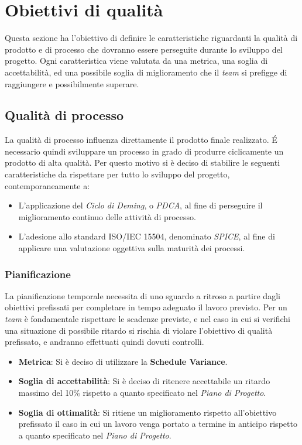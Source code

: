 \section{Obiettivi di qualità}
Questa sezione ha l'obiettivo di definire le caratteristiche riguardanti la qualità di prodotto e di processo che dovranno essere perseguite durante lo sviluppo del progetto.
Ogni caratteristica viene valutata da una metrica, una soglia di accettabilità, ed una possibile soglia di miglioramento che il \emph{team} si prefigge di raggiungere e possibilmente superare.

\subsection{Qualità di processo}
La qualità di processo influenza direttamente il prodotto finale realizzato. É necessario quindi sviluppare un processo in grado di produrre ciclicamente un prodotto di alta qualità. Per questo motivo si è deciso di stabilire le seguenti caratteristiche da rispettare per tutto lo sviluppo del progetto, contemporaneamente a:
\begin{itemize}
\item L'applicazione del \emph{Ciclo di Deming}, o \emph{PDCA}, al fine di perseguire il miglioramento continuo delle attività di processo.
\item L'adesione allo standard ISO/IEC 15504, denominato \emph{SPICE}, al fine di applicare una valutazione oggettiva sulla maturità dei processi.
\end{itemize} 

\subsubsection{Pianificazione}
La pianificazione temporale necessita di uno sguardo a ritroso a partire dagli obiettivi prefissati per completare in tempo adeguato il lavoro previsto. Per un \emph{team} è fondamentale rispettare le scadenze previste, e nel caso in cui si verifichi una situazione di possibile ritardo si rischia di violare l'obiettivo di qualità prefissato, e andranno effettuati quindi dovuti controlli.
\begin{itemize}
	\item \textbf{Metrica}: Si è deciso di utilizzare la \textbf{Schedule Variance}.
	\item \textbf{Soglia di accettabilità}: Si è deciso di ritenere accettabile un ritardo massimo del 10\% rispetto a quanto specificato nel \emph{Piano di Progetto}.
	\item \textbf{Soglia di ottimalità}: Si ritiene un miglioramento rispetto all'obiettivo prefissato il caso in cui un lavoro venga portato a termine in anticipo rispetto a quanto specificato nel \emph{Piano di Progetto}.
\end{itemize}

